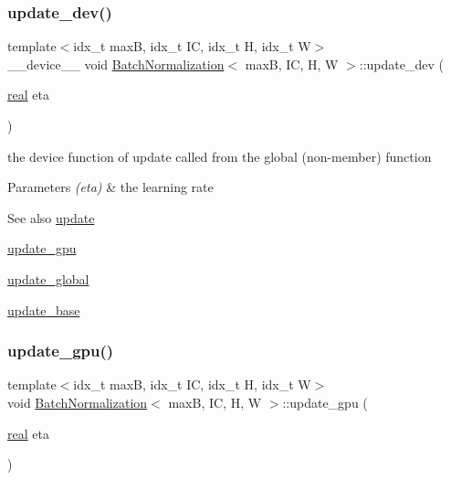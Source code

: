 \subsubsection{\texorpdfstring{update\+\_\+dev()}{update\_dev()}}
{\footnotesize\ttfamily template$<$idx\+\_\+t maxB, idx\+\_\+t IC, idx\+\_\+t H, idx\+\_\+t W$>$ \\
\+\_\+\+\_\+device\+\_\+\+\_\+ void \hyperlink{structBatchNormalization}{Batch\+Normalization}$<$ maxB, IC, H, W $>$\+::update\+\_\+dev (\begin{DoxyParamCaption}\item[{\hyperlink{vgg__util_8h_a1082d08aaa761215ec83e7149f27ad16}{real}}]{eta }\end{DoxyParamCaption})\hspace{0.3cm}{\ttfamily [inline]}}



the device function of update called from the global (non-\/member) function 


\begin{DoxyParams}{Parameters}
{\em (eta)} & the learning rate \\
\hline
\end{DoxyParams}
\begin{DoxySeeAlso}{See also}
\hyperlink{structBatchNormalization_a71b4c3d0b5002d84ba2d74f47f7ab8d2}{update} 

\hyperlink{structBatchNormalization_a1e65c4b6e011da3e8176e56ccb83e453}{update\+\_\+gpu} 

\hyperlink{linear_8h_a810703be28422bb9483665cbdbafd968}{update\+\_\+global} 

\hyperlink{structBatchNormalization_a757cb54212040fca8bc2465bbac26636}{update\+\_\+base} 
\end{DoxySeeAlso}
\mbox{\label{structBatchNormalization_a1e65c4b6e011da3e8176e56ccb83e453}} 
\subsubsection{\texorpdfstring{update\+\_\+gpu()}{update\_gpu()}}
{\footnotesize\ttfamily template$<$idx\+\_\+t maxB, idx\+\_\+t IC, idx\+\_\+t H, idx\+\_\+t W$>$ \\
void \hyperlink{structBatchNormalization}{Batch\+Normalization}$<$ maxB, IC, H, W $>$\+::update\+\_\+gpu (\begin{DoxyParamCaption}\item[{\hyperlink{vgg__util_8h_a1082d08aaa761215ec83e7149f27ad16}{real}}]{eta }\end{DoxyParamCaption})\hspace{0.3cm}{\ttfamily [inline]}}



